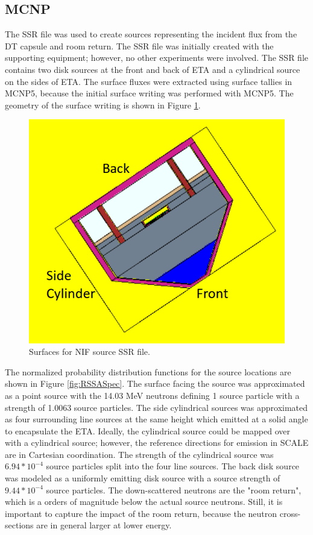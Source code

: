 \subsection{MCNP}

The SSR file was used to create sources representing the incident flux from the DT capsule and room return. 
The SSR file was initially created with the supporting equipment; however, no other experiments were involved. 
The SSR file contains two disk sources at the front and back of ETA and a cylindrical source on the sides of ETA. 
The surface fluxes were extracted using surface tallies in MCNP5, because the initial surface writing was performed with MCNP5. 
The geometry of the surface writing is shown in Figure \ref{fig:sursource}. 

\begin{figure}[ht]
	\includegraphics[width=\linewidth]{Figures/Chapter3/SurfacesSSR.png}
	\caption{Surfaces for NIF source SSR file.}
	\label{fig:sursource}
\end{figure}


The normalized probability distribution functions for the source locations are shown in Figure \ref{fig:RSSASpec}. 
The surface facing the source was approximated as a point source with the 14.03 MeV neutrons defining 1 source particle with a strength of 1.0063 source particles. 
The side cylindrical sources was approximated as four surrounding line sources at the same height which emitted at a solid angle to encapsulate the ETA. 
Ideally, the cylindrical source could be mapped over with a cylindrical source; however, the reference directions for emission in SCALE are in Cartesian coordination. 
The strength of the cylindrical source was $6.94*10^{-4}$ source particles split into the four line sources. 
The back disk source was modeled as a uniformly emitting disk source with a source strength of $9.44*10^{-4}$ source particles. 
The down-scattered neutrons are the "room return", which is a orders of magnitude below the actual source neutrons. 
Still, it is important to capture the impact of the room return, because the neutron cross-sections are in general larger at lower energy. 

